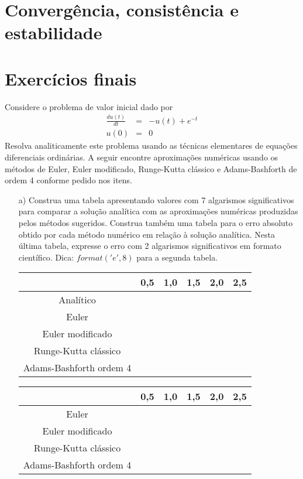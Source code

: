 \section{Convergência, consistência e estabilidade}

\construirSec

\section{Exercícios finais}


\begin{exer} Considere o problema de valor inicial dado por
\begin{eqnarray}
\frac{d u(t)}{dt} &=& -u(t) + e^{-t} \\
u(0)&=&0
\end{eqnarray}
Resolva analiticamente este problema usando as técnicas elementares de equações diferenciais ordinárias. A seguir encontre aproximações numéricas usando os métodos de Euler, Euler modificado, Runge-Kutta clássico e Adams-Bashforth de ordem 4 conforme pedido nos itens.
\begin{itemize}
\item[a)]  Construa uma tabela apresentando valores com 7 algarismos significativos para comparar a solução analítica com as aproximações numéricas produzidas pelos métodos sugeridos. Construa também uma tabela para o erro absoluto obtido por cada método numérico em relação à solução analítica. Nesta última tabela, expresse o erro com 2 algarismos significativos em formato científico. Dica: $format('e',8)$ para a segunda tabela.
\begin{center}
\begin{tabular}{|c|c|c|c|c|c|}
\hline
&0,5&1,0&1,5&2,0&2,5\\
\hline
Analítico&&&&&\\
\hline
Euler&&&&&\\
\hline
Euler modificado&&&&&\\
\hline
Runge-Kutta clássico&&&&&\\
\hline
Adams-Bashforth ordem 4&&&&&\\
\hline
\end{tabular}
\end{center}

\begin{center}
\begin{tabular}{|c|c|c|c|c|c|}
\hline
&0,5&1,0&1,5&2,0&2,5\\
\hline
Euler&&&&&\\
\hline
Euler modificado&&&&&\\
\hline
Runge-Kutta clássico&&&&&\\
\hline
Adams-Bashforth ordem 4&&&&&\\
\hline
\end{tabular}
\end{center}


\end{itemize}
\end{exer}
